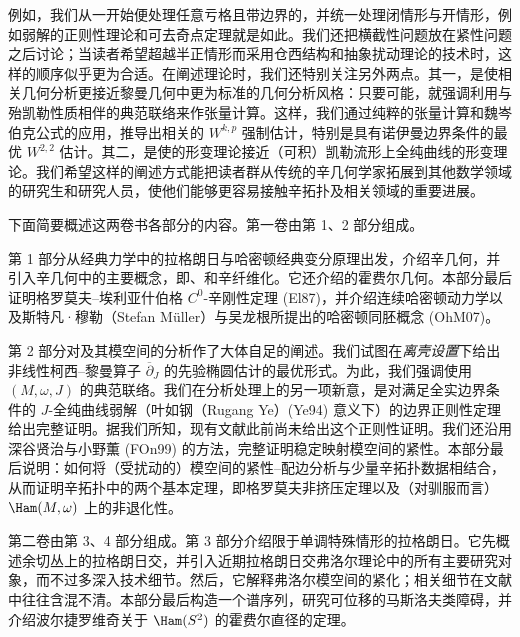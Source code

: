 例如，我们从一开始便处理任意亏格且带边界的\termPseudoholomorphicCurve{}，并统一处理闭情形与开情形，例如弱解的正则性理论和可去奇点定理就是如此。我们还把横截性问题放在紧性问题之后讨论；当读者希望超越半正情形而采用仓西结构和抽象扰动理论的技术时，这样的顺序似乎更为合适。在阐述\termPseudoholomorphicCurve{}理论时，我们还特别关注另外两点。其一，是使相关几何分析更接近黎曼几何中更为标准的几何分析风格：只要可能，就强调利用与殆凯勒性质相伴的典范联络来作张量计算。这样，我们通过纯粹的张量计算和魏岑伯克公式的应用，推导出相关的 $W^{k,p}$ 强制估计，特别是具有诺伊曼边界条件的最优 $W^{2,2}$ 估计。其二，是使\termPseudoholomorphicCurve{}的形变理论接近（可积）凯勒流形上全纯曲线的形变理论。我们希望这样的阐述方式能把读者群从传统的辛几何学家拓展到其他数学领域的研究生和研究人员，使他们能够更容易接触辛拓扑及相关领域的重要进展。

下面简要概述这两卷书各部分的内容。第一卷由第 1、2 部分组成。

第 1 部分从经典力学中的拉格朗日与哈密顿经典变分原理出发，介绍辛几何，并引入辛几何中的主要概念，即\termLagrangianSubmanifold{}、\termHamiltonianDiffeomorphism{}和辛纤维化。它还介绍\termHamiltonianDiffeomorphism{}的霍费尔几何。本部分最后证明格罗莫夫--埃利亚什伯格 $C^0$-辛刚性定理 (El87)，并介绍连续哈密顿动力学以及斯特凡·穆勒（Stefan Müller）与吴龙根所提出的哈密顿同胚概念 (OhM07)。

第 2 部分对\termPseudoholomorphicCurve{}及其模空间的分析作了大体自足的阐述。我们试图在\emph{离壳设置}下给出非线性柯西--黎曼算子 $\overline\partial_J$ 的先验椭圆估计的最优形式。为此，我们强调使用\termAlmostKahlerManifold{} $(M,\omega,J)$ 的典范联络。我们在分析处理上的另一项新意，是对满足全实边界条件的 $J$-全纯曲线弱解（叶如钢（Rugang Ye）(Ye94) 意义下）的边界正则性定理给出完整证明。据我们所知，现有文献此前尚未给出这个正则性证明。我们还沿用深谷贤治与小野薫 (FOn99) 的方法，完整证明稳定映射模空间的紧性。本部分最后说明：如何将（受扰动的）\termPseudoholomorphicCurve{}模空间的紧性--配边分析与少量辛拓扑数据相结合，从而证明辛拓扑中的两个基本定理，即格罗莫夫非挤压定理以及（对驯服\termSymplecticManifold{}而言）$\Ham(M,\omega)$ 上\termHoferNorm{}的非退化性。

第二卷由第 3、4 部分组成。第 3 部分介绍限于单调\termLagrangianSubmanifold{}特殊情形的拉格朗日\termFloerHomology{}。它先概述余切丛上的拉格朗日交\termFloerHomology{}，并引入近期拉格朗日交弗洛尔理论中的所有主要研究对象，而不过多深入技术细节。然后，它解释弗洛尔模空间的紧化；相关细节在文献中往往含混不清。本部分最后构造一个谱序列，研究可位移\termLagrangianSubmanifold{}的马斯洛夫类障碍，并介绍波尔捷罗维奇关于 $\Ham(S^2)$ 的霍费尔直径的定理。

